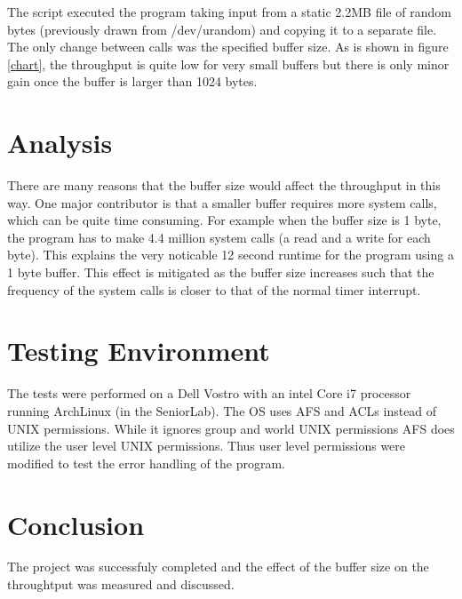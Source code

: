 \documentclass[titlepage,12pt]{article}
\begin{document}
The script executed the program taking input from a static 2.2MB file of random bytes (previously drawn from /dev/urandom) and copying it to a separate file.  The only change between calls was the specified buffer size.  As is shown in figure \ref{chart}, the throughput is quite low for very small buffers but there is only minor gain once the buffer is larger than 1024 bytes.  
\section{Analysis}
There are many reasons that the buffer size would affect the throughput in this way.  One major contributor is that a smaller buffer requires more system calls, which can be quite time consuming.  For example when the buffer size is 1 byte, the program has to make 4.4 million system calls (a read and a write for each byte).  This explains the very noticable 12 second runtime for the program using a 1 byte buffer.  This effect is mitigated as the buffer size increases such that the frequency of the system calls is closer to that of the normal timer interrupt.  
\section{Testing Environment}
The tests were performed on a Dell Vostro with an intel Core i7 processor running ArchLinux (in the SeniorLab).   The OS uses AFS and ACLs instead of UNIX permissions.  While it ignores group and world UNIX permissions AFS does utilize the user level UNIX permissions.  Thus user level permissions were modified to test the error handling of the program.  
\section{Conclusion}
The project was successfuly completed and the effect of the buffer size on the throughtput was measured and discussed.  
\end{document}
